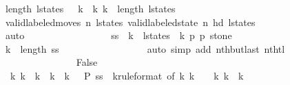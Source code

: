 \begin{isabellebody}
\ {\isacharbackquoteopen}length\ l{\isacharunderscore}states\ {\isasymge}\ {}{\isacharbackquoteclose}\ {\isacharbackquoteopen}k{}\ {\isacharless}\ k{}{\isacharbackquoteclose}\ {\isacharbackquoteopen}k{}\ {\isacharless}\ length\ l{\isacharunderscore}states{\isacharbackquoteclose}\isanewline
\ \ \ \ \ \ \ \ \ \ \ \ \ \ \ \ \isamarkupfalse%
\ {\isacharbackquoteopen}valid{\isacharunderscore}labeled{\isacharunderscore}moves\ n\ l{\isacharunderscore}states{\isacharbackquoteclose}\ {\isacharbackquoteopen}valid{\isacharunderscore}labeled{\isacharunderscore}state\ n\ {\isacharparenleft}hd\ l{\isacharunderscore}states{\isacharparenright}{\isacharbackquoteclose}\isanewline
\ \ \ \ \ \ \ \ \ \ \ \ \ \ \ \ \isamarkupfalse%
\ auto\isanewline
\ \ \ \ \ \ \ \ \ \ \ \ \ \ \isamarkupfalse%
\ \isamarkupfalse%
\ {\isachardoublequoteopen}{\isacharquery}ss\ {\isacharbang}\ k{\isacharprime}\ {\isacharequal}\ {\isacharparenleft}l{\isacharunderscore}states\ {\isacharbang}\ k{\isacharprime}{\isacharcomma}\ p{}{\isacharprime}{\isacharprime}{\isacharcomma}\ p{}{\isacharprime}{\isacharprime}{\isacharcomma}\ stone{\isacharparenright}{\isachardoublequoteclose}\isanewline
\ \ \ \ \ \ \ \ \ \ \ \ \ \ \ \ \isamarkupfalse%
\ {\isacharbackquoteopen}k{}\ {\isacharless}\ length\ {\isacharquery}ss{\isacharbackquoteclose}\isanewline
\ \ \ \ \ \ \ \ \ \ \ \ \ \ \ \ \isamarkupfalse%
\ {\isacharparenleft}auto\ simp\ add{\isacharcolon}\ nth{\isacharunderscore}butlast\ nth{\isacharunderscore}tl{\isacharparenright}\isanewline
\ \ \ \ \ \ \ \ \ \ \ \ \ \ \isamarkupfalse%
\ False\isanewline
\ \ \ \ \ \ \ \ \ \ \ \ \ \ \ \ \isamarkupfalse%
\ {\isacharbackquoteopen}{\isasymforall}\ k{\isacharprime}{\isachardot}\ k{}\ {\isacharless}\ k{\isacharprime}\ {\isasymand}\ k{\isacharprime}\ {\isacharless}\ k{}\ {\isasymlongrightarrow}\ {\isasymnot}\ {\isacharquery}P\ {\isacharparenleft}{\isacharquery}ss\ {\isacharbang}\ k{\isacharprime}{\isacharparenright}{\isacharbackquoteclose}{\isacharbrackleft}rule{\isacharunderscore}format{\isacharcomma}\ of\ k{\isacharprime}{\isacharbrackright}\ {\isacharbackquoteopen}k{}\ {\isacharplus}\ {}\ {\isasymle}\ k{\isacharprime}{\isacharbackquoteclose}\ {\isacharbackquoteopen}k{\isacharprime}\ {\isacharless}\ k{}{\isacharbackquoteclose}\isanewline
\ \ \ \ \ \ \ \ \ \ \ \ \ \ \ \ \isamarkupfalse%

\end{isabellebody}
